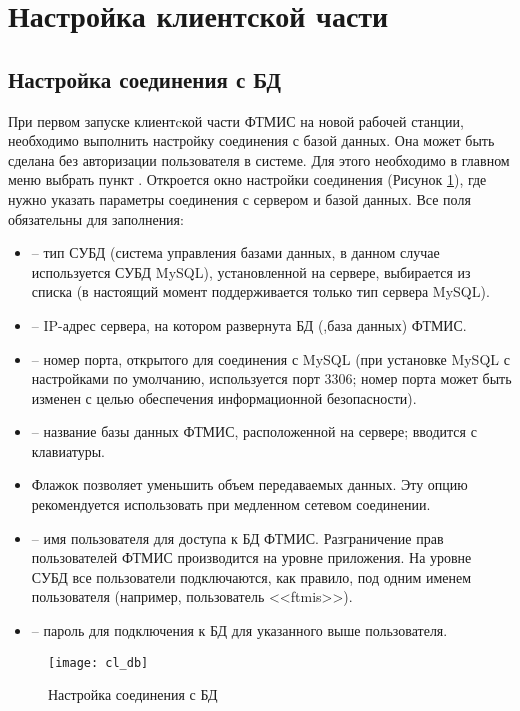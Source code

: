 \newpage
\section{Настройка клиентской части}

\subsection{Настройка соединения с БД}

При первом запуске клиентcкой части ФТМИС на новой рабочей станции, необходимо выполнить настройку соединения с базой данных. Она может быть сделана без авторизации пользователя в системе. Для этого необходимо в главном меню выбрать пункт . Откроется окно настройки соединения (Рисунок \ref{img_cl_db}), где нужно указать параметры соединения с сервером и базой данных. Все поля обязательны для заполнения:
\begin{itemize}
 \item {} – тип СУБД (система управления базами данных, в данном случае используется СУБД MySQL), установленной на сервере, выбирается из списка (в настоящий момент поддерживается только тип сервера MySQL).
 \item {} – IP-адрес сервера, на котором развернута БД (,база данных) ФТМИС.
 \item {} – номер порта, открытого для соединения с MySQL (при установке MySQL с настройками по умолчанию, используется порт 3306; номер порта может быть изменен с целью обеспечения информационной безопасности).
 \item {} – название базы данных ФТМИС, расположенной на сервере; вводится с клавиатуры.
 \item Флажок  позволяет уменьшить объем передаваемых данных. Эту опцию рекомендуется использовать при медленном сетевом соединении.
 \item {} – имя пользователя для доступа к БД ФТМИС. Разграничение прав пользователей ФТМИС производится на уровне приложения. На уровне СУБД все пользователи подключаются, как правило, под одним именем пользователя (например, пользователь <<ftmis>>).
 \item {} – пароль для подключения к БД для указанного выше пользователя.
\end{itemize}

\begin{figure}[ht]\centering
 \texttt{[image: cl\_db]}
 \caption{Настройка соединения с БД}
 \label{img_cl_db}
\end{figure} 

